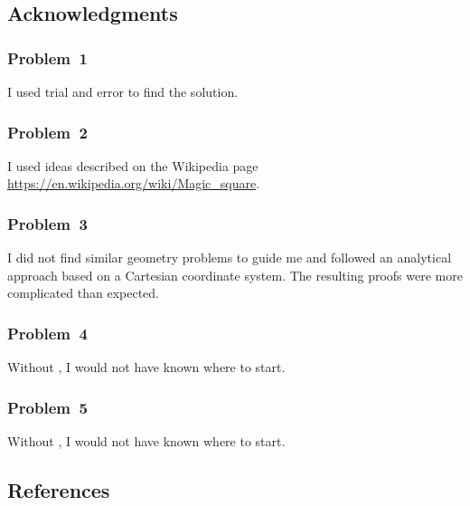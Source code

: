 
\newpage\clearpage
\subsection*{Acknowledgments}

\subsubsection*{Problem~1}
I used trial and error to find the solution.

\subsubsection*{Problem~2}
I used ideas described on the Wikipedia page
\newline 
\url{https://en.wikipedia.org/wiki/Magic_square}. 

\subsubsection*{Problem~3}
I did not find similar geometry problems to guide me and followed an analytical approach based on a Cartesian coordinate system. The resulting proofs were more complicated than expected. 

\subsubsection*{Problem~4}
Without \cite{aops:1983}, I would not have known where to start.

\subsubsection*{Problem~5}
Without \cite{j23:2013}, I would not have known where to start.

\subsection*{References}
\printbibliography
